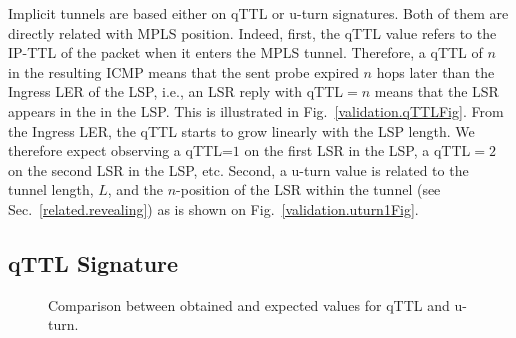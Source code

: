 
Implicit tunnels are based either on qTTL or u-turn signatures. Both of them are
directly related with MPLS position.  Indeed, first, the qTTL value refers to
the IP-TTL of the \echorequest packet when it enters the MPLS tunnel.
Therefore, a qTTL of $n$ in the resulting ICMP \ttlexceeded means that the sent
probe expired $n$ hops later than the Ingress LER of the LSP, i.e., an LSR reply
with qTTL$=n$ means that the LSR appears in the  in the LSP.
This is illustrated in Fig.~\ref{validation.qTTLFig}.  From the Ingress LER, the
qTTL starts to grow linearly with the LSP length.  We therefore expect observing
a qTTL=$1$ on the first LSR in the LSP, a qTTL$=2$ on the second LSR in the LSP,
etc.  Second, a u-turn value is related to the tunnel length, $L$, and the
$n$-position of the LSR within the tunnel (see Sec.~\ref{related.revealing}) as
is shown on Fig.~\ref{validation.uturn1Fig}.

\subsection{qTTL Signature}\label{validation.qttl}
\begin{figure}[!t]
  \begin{center}
\hspace{-0.3cm}      
  \end{center}
\vspace{-0.5cm}  
  \caption{Comparison between obtained and expected values for qTTL and u-turn.}
  \label{validation.qttl.fig}
\end{figure}

